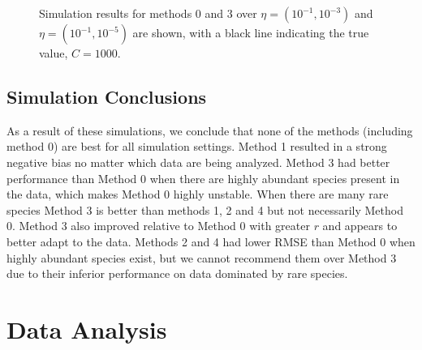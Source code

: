 \documentclass[oupdraft]{bio}
\begin{document}
\begin{figure}[t]
\caption{Simulation results for methods 0 and 3 over $\eta = (10^{-1}, 10^{-3})$ and $\eta = (10^{-1}, 10^{-5})$ are shown, with a black line indicating the true value, $C = 1000$.
\label{fig:tuning_sim_2}}
\centering{}
\end{figure}

\subsection{Simulation Conclusions}

As a result of these simulations, we conclude that none of the methods (including method 0) are best for all simulation settings.  Method 1 resulted in a strong negative bias no matter which data are being analyzed.  Method 3 had better performance than Method 0 when there are highly abundant species present in the data, which makes Method 0 highly unstable.  When there are many rare species Method 3 is better than methods 1, 2 and 4 but not necessarily Method 0.  Method 3 also improved relative to Method 0 with greater $r$ and appears to better adapt to the data.  Methods 2 and 4 had lower RMSE than Method 0 when highly abundant species exist, but we cannot recommend them over Method 3 due to their inferior performance on data dominated by rare species.

\section{Data Analysis}
\label{sec:data_analysis}

\end{document}
